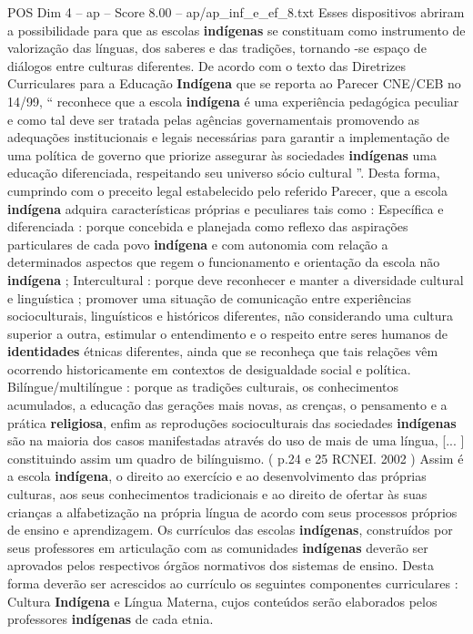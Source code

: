 \begin{textsample}{POS Dim 4 – ap – Score 8.00 – ap/ap\_inf\_e\_ef\_8.txt}
Esses dispositivos abriram a possibilidade para que as escolas \textbf{indígenas} se constituam como instrumento de valorização das línguas, dos saberes e das tradições, tornando -se espaço de diálogos entre culturas diferentes.
De acordo com o texto das Diretrizes Curriculares para a Educação \textbf{Indígena} que se reporta ao Parecer CNE/CEB no 14/99, “ reconhece que a escola \textbf{indígena} é uma experiência pedagógica peculiar e como tal deve ser tratada pelas agências governamentais promovendo as adequações institucionais e legais necessárias para garantir a implementação de uma política de governo que priorize assegurar às sociedades \textbf{indígenas} uma educação diferenciada, respeitando seu universo sócio cultural ”.
Desta forma, cumprindo com o preceito legal estabelecido pelo referido Parecer, que a escola \textbf{indígena} adquira características próprias e peculiares tais como : Específica e diferenciada : porque concebida e planejada como reflexo das aspirações particulares de cada povo \textbf{indígena} e com autonomia com relação a determinados aspectos que regem o funcionamento e orientação da escola não \textbf{indígena} ; Intercultural : porque deve reconhecer e manter a diversidade cultural e linguística ; promover uma situação de comunicação entre experiências socioculturais, linguísticos e históricos diferentes, não considerando uma cultura superior a outra, estimular o entendimento e o respeito entre seres humanos de \textbf{identidades} étnicas diferentes, ainda que se reconheça que tais relações vêm ocorrendo historicamente em contextos de desigualdade social e política.
Bilíngue/multilíngue : porque as tradições culturais, os conhecimentos acumulados, a educação das gerações mais novas, as crenças, o pensamento e a prática \textbf{religiosa}, enfim as reproduções socioculturais das sociedades \textbf{indígenas} são na maioria dos casos manifestadas através do uso de mais de uma língua, [... ] constituindo assim um quadro de bilínguismo. ( p.24 e 25 RCNEI. 2002 ) Assim é a escola \textbf{indígena}, o direito ao exercício e ao desenvolvimento das próprias culturas, aos seus conhecimentos tradicionais e ao direito de ofertar às suas crianças a alfabetização na própria língua de acordo com seus processos próprios de ensino e aprendizagem.
Os currículos das escolas \textbf{indígenas}, construídos por seus professores em articulação com as comunidades \textbf{indígenas} deverão ser aprovados pelos respectivos órgãos normativos dos sistemas de ensino.
Desta forma deverão ser acrescidos ao currículo os seguintes componentes curriculares : Cultura \textbf{Indígena} e Língua Materna, cujos conteúdos serão elaborados pelos professores \textbf{indígenas} de cada etnia.

\end{textsample}
